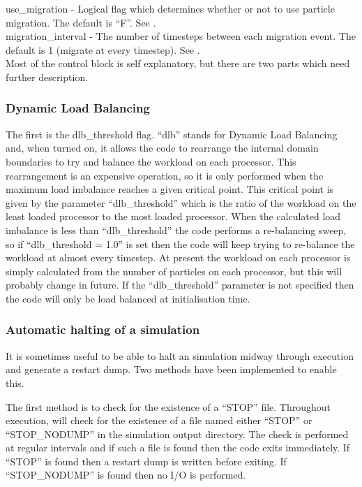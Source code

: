 {\emphtext use\_migration} - Logical flag which determines whether or not to
  use particle migration. The default is ``F''. See .\\

{\emphtext migration\_interval} - The number of timesteps between each
  migration event.  The default is 1 (migrate at every timestep).
  See .\\

Most of the control block is self explanatory, but there are two parts which
need further description.

\subsubsection{Dynamic Load Balancing}
The first is the {\emphtext dlb\_threshold} flag.
``dlb'' stands for Dynamic Load Balancing and, when turned on, it allows the
code to rearrange the internal domain boundaries to try and balance the
workload on each processor. This rearrangement is an expensive operation, so
it is only performed when the maximum load imbalance reaches a given critical
point. This critical point is given by the parameter ``dlb\_threshold'' which
is the ratio of the workload on the least loaded processor to the most loaded
processor. When the calculated load imbalance is less than ``dlb\_threshold''
the code performs a re-balancing sweep, so if ``dlb\_threshold = 1.0'' is set
then the code will keep trying to re-balance the workload at almost every
timestep. At present the workload on each processor is simply calculated from
the number of particles on each processor, but this will probably change in
future. If the ``dlb\_threshold'' parameter is not specified then the code
will only be load balanced at initialisation time.

\subsubsection{Automatic halting of a simulation}
It is sometimes useful to be able to halt an {\EPOCH} simulation midway through
execution and generate a restart dump. Two methods have been implemented to
enable this.

The first method is to check for the existence of a ``STOP'' file. Throughout
execution, {\EPOCH} will check for the existence of a file named either
``STOP'' or ``STOP\_NODUMP'' in the simulation output directory. The check is
performed at regular intervals and if such a file is found then the code
exits immediately. If ``STOP'' is found then a restart dump is written before
exiting. If ``STOP\_NODUMP'' is found then no I/O is performed.

